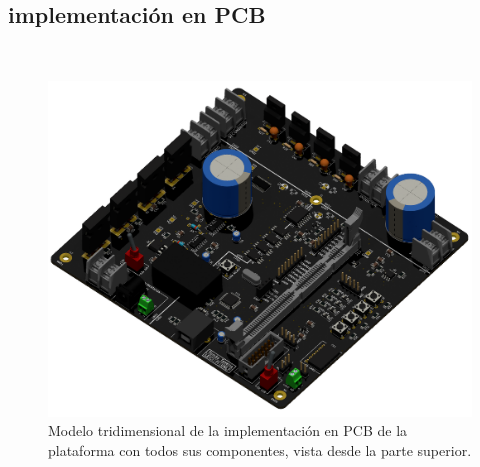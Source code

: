 \subsection{implementación en PCB}

\lipsum[3]\\

\begin{figure}[h]
    \centering
    \includegraphics[scale=0.32]{Imagenes/PCB 3D Raytracing.png}
    \caption{Modelo tridimensional de la implementación en PCB de la plataforma con todos sus componentes, vista desde la parte superior.}
    \label{fig:PCB_3D}
\end{figure}

\lipsum[4]\\

\newpage\afterpage{\blankpage}

